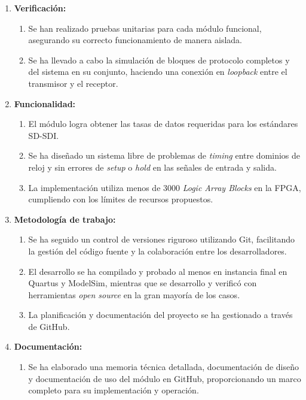   \begin{enumerate}
      \item \textbf{Verificación:}
      \begin{enumerate}
          \item Se han realizado pruebas unitarias para cada módulo funcional,
          asegurando su correcto funcionamiento de manera aislada.
          \item Se ha llevado a cabo la simulación de bloques de protocolo
          completos y del sistema en su conjunto, haciendo una conexión en
          \textit{loopback} entre el transmisor y el receptor.
      \end{enumerate}
      \item \textbf{Funcionalidad:}
      \begin{enumerate}
          \item El módulo logra obtener las tasas de datos requeridas para los
          estándares SD-SDI\@.
          \item Se ha diseñado un sistema libre de problemas de \textit{timing}
          entre dominios de reloj y sin errores de \textit{setup} o \textit{hold}
          en las señales de entrada y salida.
          \item La implementación utiliza menos de 3000 \textit{Logic Array Blocks}
          en la FPGA, cumpliendo con los límites de recursos propuestos.
      \end{enumerate}
      \item \textbf{Metodología de trabajo:}
      \begin{enumerate}
          \item Se ha seguido un control de versiones riguroso utilizando Git,
          facilitando la gestión del código fuente y la colaboración entre los
          desarrolladores.
          \item El desarrollo se ha compilado y probado al menos en instancia final
          en Quartus y ModelSim, mientras que se desarrollo y verificó con
          herramientas \textit{open source} en la gran mayoría de los casos.
          \item La planificación y documentación del proyecto se ha gestionado a
          través de GitHub.
      \end{enumerate}
      \item \textbf{Documentación:}
      \begin{enumerate}
          \item Se ha elaborado una memoria técnica detallada, documentación de
          diseño y documentación de uso del módulo en GitHub, proporcionando un
          marco completo para su implementación y operación.
      \end{enumerate}
  \end{enumerate}

